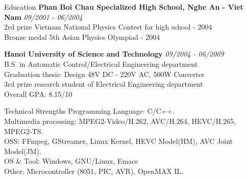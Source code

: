 \documentclass{resume}
\begin{document}
  \begin{rSection}{Education}
    {\bf Phan Boi Chau Specialized High School, Nghe An - Viet Nam} \hfill {\em 09/2001 - 06/2004} \\ 
    { 2rd prize Vietnam National Physics Contest for high school - 2004 } \\
    { Bronze medal 5th Asian Physics Olympiad - 2004 }

    {\bf Hanoi University of Science and Technology} \hfill {\em 09/2004 - 06/2009} \\ 
    { B.S. in Automatic Control/Electrical Engineering department} \\
    { Graduation thesis: Design 48V DC - 220V AC, 500W Converter } \\
    { 3rd prize research student of Electrical Engineering department } \\
    Overall GPA: 8.15/10
  \end{rSection}

  \begin{rSection}{Technical Strengths}
    Programming Language: C/C++. \\
    Multimedia processing: MPEG2-Video/H.262, AVC/H.264, HEVC/H.265, MPEG2-TS. \\
    OSS: FFmpeg, GStreamer, Linux Kernel, HEVC Model(HM), AVC Joint Model(JM). \\
    OS \& Tool: Windows, GNU/Linux, Emacs \\
    Other: Microcontroller (8051, PIC, AVR), OpenMAX IL.
  \end{rSection}
\end{document}
